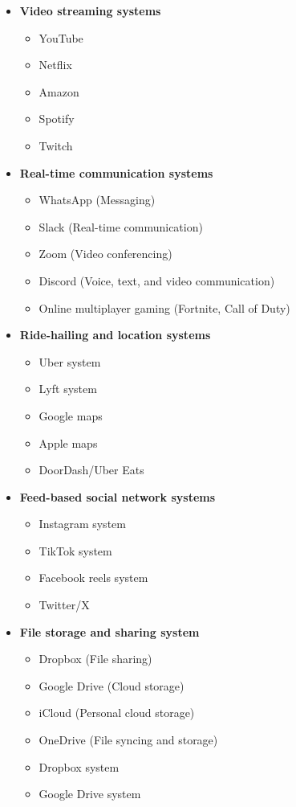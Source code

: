 \vspace{0.3cm}
\begin{itemize}
\item \textbf{Video streaming systems}
\begin{itemize}
\item YouTube
\item Netflix
\item Amazon
\item Spotify
\item Twitch
\end{itemize}
\end{itemize}
\begin{itemize}
\item \textbf{Real-time communication systems}
\begin{itemize}
\item WhatsApp (Messaging)
\item Slack (Real-time communication)
\item Zoom (Video conferencing)
\item Discord (Voice, text, and video communication)
\item Online multiplayer gaming (Fortnite, Call of Duty)
\end{itemize}
\end{itemize}
\begin{itemize}
\item \textbf{Ride-hailing and location systems}
\begin{itemize}
\item Uber system
\item Lyft system
\item Google maps
\item Apple maps
\item DoorDash/Uber Eats
\end{itemize}
\end{itemize}
\begin{itemize}
\item \textbf{Feed-based social network systems}
\begin{itemize}
\item Instagram system
\item TikTok system
\item Facebook reels system
\item Twitter/X
\end{itemize}
\end{itemize}
\begin{itemize}
\item \textbf{File storage and sharing system}
\begin{itemize}
\item Dropbox (File sharing)
\item Google Drive (Cloud storage)
\item iCloud (Personal cloud storage)
\item OneDrive (File syncing and storage)
\item Dropbox system
\item Google Drive system
\end{itemize}
\end{itemize}


